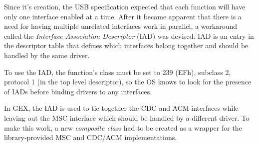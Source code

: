 Since it's creation, the USB specification expected that each function will have only one interface enabled at a time. After it became apparent that there is a need for having multiple unrelated interfaces work in parallel, a workaround called the \textit{Interface Association Descriptor} (IAD) was devised. IAD is an entry in the descriptor table that defines which interfaces belong together and should be handled by the same driver.

To use the IAD, the function's class must be set to 239 (EFh), subclass 2, protocol 1 (in the top level descriptor), so the OS knows to look for the presence of IADs before binding drivers to any interfaces. 


In GEX, the IAD is used to tie together the CDC and ACM interfaces while leaving out the MSC interface which should be handled by a different driver. To make this work, a new \textit{composite class} had to be created as a wrapper for the library-provided MSC and CDC/ACM implementations.






